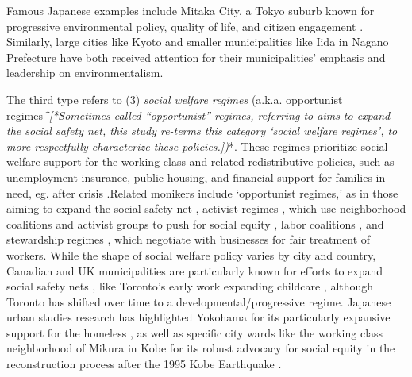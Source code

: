 \documentclass[preprint, 3p,
authoryear]{elsarticle} %
\begin{document}
Famous Japanese examples include Mitaka City, a Tokyo suburb known for
progressive environmental policy, quality of life, and citizen
engagement \citep{takao_2006}. Similarly, large cities like Kyoto
\citep{sugiyama_and_takeuchi_2008} and smaller municipalities like Iida
in Nagano Prefecture \citep{fraser_et_al_2020} have both received
attention for their municipalities' emphasis and leadership on
environmentalism.

The third type refers to (3) \emph{social welfare regimes} (a.k.a.
opportunist regimes\emph{\^{}{[}*Sometimes called ``opportunist''
regimes, referring to aims to expand the social safety net, this study
re-terms this category `social welfare regimes', to more respectfully
characterize these policies.{]})}*. These regimes prioritize social
welfare support for the working class and related redistributive
policies, such as unemployment insurance, public housing, and financial
support for families in need, eg. after crisis
\citep{stone_1993, thompson_2005, camou_2014, lai_and_chui_2014, arbaci_2019}.Related
monikers include `opportunist regimes,' as in those aiming to expand the
social safety net \citep{stone_1989}, activist regimes
\citep{clark_2001}, which use neighborhood coalitions and activist
groups to push for social equity \citep{thompson_2005}, labor coalitions
\citep{camou_2014}, and stewardship regimes \citep{nissen_1995}, which
negotiate with businesses for fair treatment of workers. While the shape
of social welfare policy varies by city and country, Canadian and UK
municipalities are particularly known for efforts to expand social
safety nets \citep{saraceno_2002}, like Toronto's early work expanding
childcare \citep{mahon_2007}, although Toronto has shifted over time to
a developmental/progressive regime. Japanese urban studies research has
highlighted Yokohama for its particularly expansive support for the
homeless \citep{hayashi_2013}, as well as specific city wards like the
working class neighborhood of Mikura in Kobe for its robust advocacy for
social equity in the reconstruction process after the 1995 Kobe
Earthquake \citep{yasui_2007}.
\end{document}
